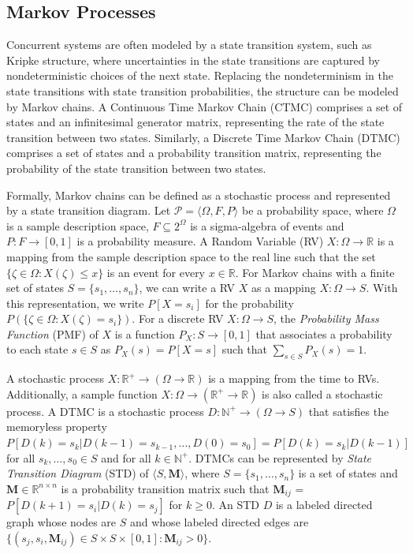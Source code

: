 \subsection{Markov Processes}

\newcommand{\Models}{|\!\!\!\equiv}

Concurrent systems are often modeled by a state transition system, such as Kripke structure, where uncertainties in the state transitions are captured by nondeterministic choices of the next state. Replacing the nondeterminism in the state transitions with state transition probabilities, the structure can be modeled by Markov chains. A Continuous Time Markov Chain (CTMC) comprises a set of states and an infinitesimal generator matrix, representing the rate of the state transition between two states. Similarly, a Discrete Time Markov Chain (DTMC) comprises a set of states and a probability transition matrix, representing the probability of the state transition between two states. 


Formally, Markov chains can be defined as a stochastic process and represented by a state transition diagram. Let $\mathcal{P}=\langle\Omega,F,P\rangle$ be a probability space, where $\Omega$ is a sample description space, $F\subseteq 2^\Omega$ is a sigma-algebra of events and $P:F\rightarrow[0,1]$ is a probability measure. A Random Variable (RV) $X:\Omega\rightarrow\mathbb{R}$ is a mapping from the sample description space to the real line such that the set $\{\zeta\in\Omega:X(\zeta)\leq x\}$ is an event for every $x\in\mathbb{R}$. For Markov chains with a finite set of states $S=\{s_1,\ldots,s_n\}$, we can write a RV $X$ as a mapping $X:\Omega\rightarrow S$. With this representation, we write $P[X=s_i]$ for the probability $P(\{\zeta\in\Omega:X(\zeta)=s_i\})$. 
For a discrete RV $X:\Omega\rightarrow S$, the {\em Probability Mass Function} (PMF) of $X$ is a function $P_X:S\rightarrow[0,1]$ that associates a probability to each state $s\in S$ as $P_X(s)=P[X=s]$ such that $\sum_{s\in S} P_X(s)=1$.


A stochastic process $X:\mathbb{R}^+\rightarrow(\Omega\rightarrow\mathbb{R})$ is a mapping from the time to RVs. Additionally, a sample function $X:\Omega\rightarrow(\mathbb{R}^+\rightarrow\mathbb{R})$ is also called a stochastic process. A DTMC is a stochastic process $D:\mathbb{N}^+\rightarrow(\Omega\rightarrow S)$ that satisfies the memoryless property $P[D(k)=s_k|D(k-1)=s_{k-1},\ldots,D(0)=s_0]=P[D(k)=s_k|D(k-1)]$ for all $s_k,\ldots,s_0\in S$ and for all $k\in\mathbb{N}^+$. DTMCs can be represented by {\em State Transition Diagram} (STD) of $\langle S,\mathbf{M}\rangle$, where $S=\{s_1,\ldots,s_n\}$ is a set of states and $\mathbf{M}\in\mathbb{R}^{n\times n}$ is a probability transition matrix such that $\mathbf{M}_{ij}$ = $P[D(k+1)=s_i|D(k)=s_j]$ for $k\geq 0$. An STD $D$ is a labeled directed graph whose nodes are $S$ and whose labeled directed edges are $\{(s_j, s_i, \mathbf{M}_{ij})\in S\times S\times [0,1]: \mathbf{M}_{ij} > 0\}$.



